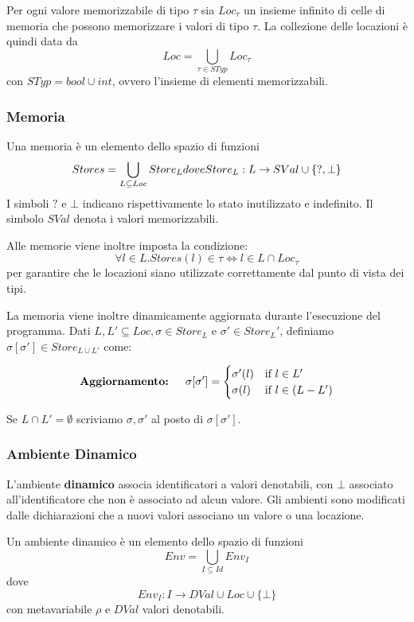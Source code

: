 \documentclass[a4paper, 10pt]{article}
\begin{document}
	Per ogni valore memorizzabile di tipo $\tau$ sia $Loc_\tau$ un insieme infinito di celle di memoria che possono memorizzare i valori di tipo $\tau$.
	La collezione delle locazioni è quindi data da 
	\[
	Loc=\bigcup\limits_{\tau\in STyp} Loc_\tau
	\] 
	con $STyp=bool \cup int$, ovvero l'insieme di elementi memorizzabili.
	
	\subsubsection{Memoria}
	Una memoria è un elemento dello spazio di funzioni 
	\[
		Stores=\bigcup\limits_{L\subseteq Loc} Store_L$$ \\ dove $$Store_L:L\to SVal \cup \{?, \bot\}
	\]
	I simboli $?$ e $\bot$ indicano rispettivamente lo stato inutilizzato e indefinito. Il simbolo $SVal$ denota i valori memorizzabili.
	
	Alle memorie viene inoltre imposta la condizione:
	$$\forall l \in L.Stores(l) \in \tau \iff l\in L\cap Loc_\tau$$ per garantire che le locazioni siano utilizzate correttamente dal punto di vista dei tipi. 
	
	\noindent
	La memoria viene inoltre dinamicamente aggiornata durante l'esecuzione del programma. Dati $L,L' \subseteq Loc, \sigma \in Store_L$ e $\sigma' \in Store_L'$, definiamo $\sigma [\sigma'] \in Store_{L \cup L'}$ come:
	
	\[
		\textup{\textbf{Aggiornamento: }} \quad
		\sigma[\sigma'] = 
		\begin{cases} 
		\sigma'(l) &\mbox{if } l\in L' \\ 
		\sigma (l) & \mbox{if } l \in (L-L') 
		\end{cases}
	\] 
	
	Se $L\cap L'=\emptyset$ scriviamo $\sigma, \sigma'$ al posto di $\sigma [\sigma']$.
	
	\subsubsection{Ambiente Dinamico}
	L'ambiente \textbf{dinamico} associa identificatori a valori denotabili, con $\bot$ associato all'identificatore che non è associato ad alcun valore. Gli ambienti sono modificati dalle dichiarazioni che a nuovi valori associano un valore o una locazione.
	
	Un ambiente dinamico è un elemento dello spazio di funzioni 
	\[
		Env=\bigcup\limits_{I\subseteq Id} Env_I
	\]
	dove
	\[
		Env_I:I \to DVal \cup Loc\cup \{\bot\}
	\] 
	con metavariabile $\rho$ e $DVal$ valori denotabili.
	
\end{document}
